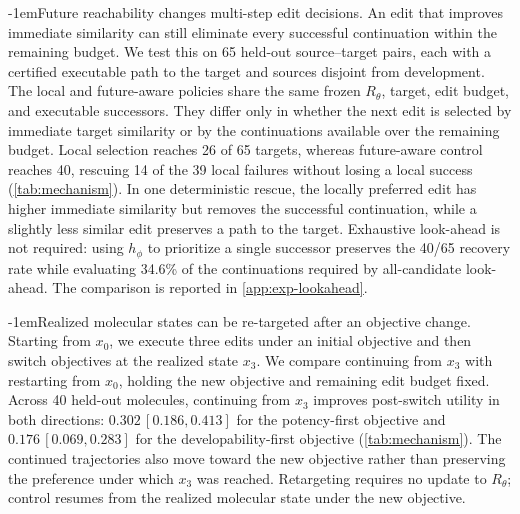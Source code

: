 \documentclass{article}
\makeatletter
\theoremstyle{definition}
\theoremstyle{remark}
\def\paragraph{\@startsection{paragraph}{4}{\z@}{1.0ex plus 0.3ex minus .2ex}%
  {-1em}{\normalsize\bf}}
\makeatother
\begin{document}
\paragraph{Future reachability changes multi-step edit decisions.}
An edit that improves immediate similarity can still eliminate every successful
continuation within the remaining budget. We test this on 65 held-out
source--target pairs, each with a certified executable path to the target and
sources disjoint from development. The local and future-aware policies share the
same frozen $R_\theta$, target, edit budget, and executable successors. They
differ only in whether the next edit is selected by immediate target similarity
or by the continuations available over the remaining budget.
Local selection reaches 26 of 65 targets, whereas future-aware control reaches
40, rescuing 14 of the 39 local failures without losing a local success
(\cref{tab:mechanism}). In one deterministic rescue, the locally preferred edit
has higher immediate similarity but removes the successful continuation, while a
slightly less similar edit preserves a path to the target. Exhaustive look-ahead
is not required: using $h_\phi$ to prioritize a single successor preserves the
40/65 recovery rate while evaluating 34.6\% of the continuations required by
all-candidate look-ahead. The comparison is reported in
\cref{app:exp-lookahead}.

\paragraph{Realized molecular states can be re-targeted after an objective change.}
Starting from $x_0$, we execute three edits under an initial objective and then
switch objectives at the realized state $x_3$. We compare continuing from $x_3$
with restarting from $x_0$, holding the new objective and remaining edit budget
fixed.
Across 40 held-out molecules, continuing from $x_3$ improves post-switch utility
in both directions: $0.302\,[0.186,0.413]$ for the potency-first objective and
$0.176\,[0.069,0.283]$ for the developability-first objective
(\cref{tab:mechanism}). The continued trajectories also move toward the new
objective rather than preserving the preference under which $x_3$ was reached.
Retargeting requires no update to $R_\theta$; control resumes from the realized
molecular state under the new objective.
\end{document}
